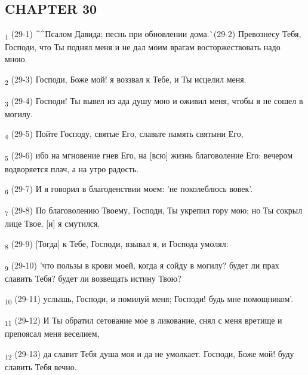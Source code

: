 \subsection{CHAPTER 30}
\begin{tcolorbox}
\textsubscript{1} (29-1) ^^Псалом Давида; песнь при обновлении дома.^^ (29-2) Превознесу Тебя, Господи, что Ты поднял меня и не дал моим врагам восторжествовать надо мною.
\end{tcolorbox}
\begin{tcolorbox}
\textsubscript{2} (29-3) Господи, Боже мой! я воззвал к Тебе, и Ты исцелил меня.
\end{tcolorbox}
\begin{tcolorbox}
\textsubscript{3} (29-4) Господи! Ты вывел из ада душу мою и оживил меня, чтобы я не сошел в могилу.
\end{tcolorbox}
\begin{tcolorbox}
\textsubscript{4} (29-5) Пойте Господу, святые Его, славьте память святыни Его,
\end{tcolorbox}
\begin{tcolorbox}
\textsubscript{5} (29-6) ибо на мгновение гнев Его, на [всю] жизнь благоволение Его: вечером водворяется плач, а на утро радость.
\end{tcolorbox}
\begin{tcolorbox}
\textsubscript{6} (29-7) И я говорил в благоденствии моем: 'не поколеблюсь вовек'.
\end{tcolorbox}
\begin{tcolorbox}
\textsubscript{7} (29-8) По благоволению Твоему, Господи, Ты укрепил гору мою; но Ты сокрыл лице Твое, [и] я смутился.
\end{tcolorbox}
\begin{tcolorbox}
\textsubscript{8} (29-9) [Тогда] к Тебе, Господи, взывал я, и Господа умолял:
\end{tcolorbox}
\begin{tcolorbox}
\textsubscript{9} (29-10) 'что пользы в крови моей, когда я сойду в могилу? будет ли прах славить Тебя? будет ли возвещать истину Твою?
\end{tcolorbox}
\begin{tcolorbox}
\textsubscript{10} (29-11) услышь, Господи, и помилуй меня; Господи! будь мне помощником'.
\end{tcolorbox}
\begin{tcolorbox}
\textsubscript{11} (29-12) И Ты обратил сетование мое в ликование, снял с меня вретище и препоясал меня веселием,
\end{tcolorbox}
\begin{tcolorbox}
\textsubscript{12} (29-13) да славит Тебя душа моя и да не умолкает. Господи, Боже мой! буду славить Тебя вечно.
\end{tcolorbox}
